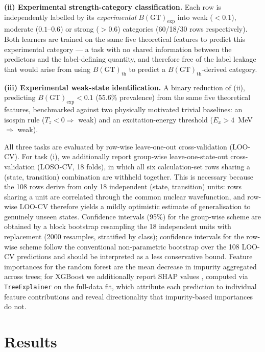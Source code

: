 \documentclass[10pt,twocolumn]{article}
\begin{document}
\textbf{(ii) Experimental strength-category classification.} Each row is independently labelled by its \emph{experimental} $B(\mathrm{GT})_{\mathrm{exp}}$ into weak ($<0.1$), moderate ($0.1$--$0.6$) or strong ($>0.6$) categories (60/18/30 rows respectively). Both learners are trained on the same five theoretical features to predict this experimental category --- a task with no shared information between the predictors and the label-defining quantity, and therefore free of the label leakage that would arise from using $B(\mathrm{GT})_{\mathrm{th}}$ to predict a $B(\mathrm{GT})_{\mathrm{th}}$-derived category.

\textbf{(iii) Experimental weak-state identification.} A binary reduction of (ii), predicting $B(\mathrm{GT})_{\mathrm{exp}} < 0.1$ (55.6\% prevalence) from the same five theoretical features, benchmarked against two physically motivated trivial baselines: an isospin rule ($T_z < 0 \Rightarrow$ weak) and an excitation-energy threshold ($E_x > 4$~MeV $\Rightarrow$ weak).

All three tasks are evaluated by row-wise leave-one-out cross-validation (LOO-CV). For task (i), we additionally report group-wise leave-one-state-out cross-validation (LOSO-CV, 18 folds), in which all six calculation-set rows sharing a (state, transition) combination are withheld together. This is necessary because the 108 rows derive from only 18 independent (state, transition) units: rows sharing a unit are correlated through the common nuclear wavefunction, and row-wise LOO-CV therefore yields a mildly optimistic estimate of generalisation to genuinely unseen states. Confidence intervals (95\%) for the group-wise scheme are obtained by a block bootstrap resampling the 18 independent units with replacement (2000 resamples, stratified by class); confidence intervals for the row-wise scheme follow the conventional non-parametric bootstrap over the 108 LOO-CV predictions and should be interpreted as a less conservative bound. Feature importances for the random forest are the mean decrease in impurity aggregated across trees; for XGBoost we additionally report SHAP values \cite{ref_shap}, computed via \texttt{TreeExplainer} on the full-data fit, which attribute each prediction to individual feature contributions and reveal directionality that impurity-based importances do not.

\section{Results}
\label{sec:results}
\end{document}
